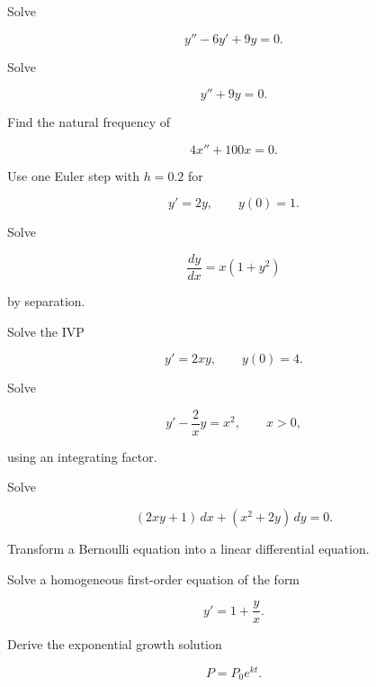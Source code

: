 \begin{exercise}[2]
Solve

\[
y''-6y'+9y=0.
\]
\end{exercise}

\begin{exercise}[2]
Solve

\[
y''+9y=0.
\]
\end{exercise}

\begin{exercise}[2]
Find the natural frequency of

\[
4x''+100x=0.
\]
\end{exercise}

\begin{exercise}[2]
Use one Euler step with \(h=0.2\) for

\[
y'=2y,
\qquad
y(0)=1.
\]
\end{exercise}

\begin{exercise}[3]
Solve

\[
\frac{dy}{dx}
=
x(1+y^2)
\]

by separation.
\end{exercise}

\begin{exercise}[3]
Solve the IVP

\[
y'
=
2xy,
\qquad
y(0)=4.
\]
\end{exercise}

\begin{exercise}[3]
Solve

\[
y'
-
\frac2x y
=
x^2,
\qquad
x>0,
\]

using an integrating factor.
\end{exercise}

\begin{exercise}[3]
Solve

\[
(2xy+1)\,dx
+
(x^2+2y)\,dy
=
0.
\]
\end{exercise}

\begin{exercise}[3]
Transform a Bernoulli equation into a linear differential equation.
\end{exercise}

\begin{exercise}[3]
Solve a homogeneous first-order equation of the form

\[
y'
=
1+\frac{y}{x}.
\]
\end{exercise}

\begin{exercise}[3]
Derive the exponential growth solution

\[
P=P_0e^{kt}.
\]
\end{exercise}

